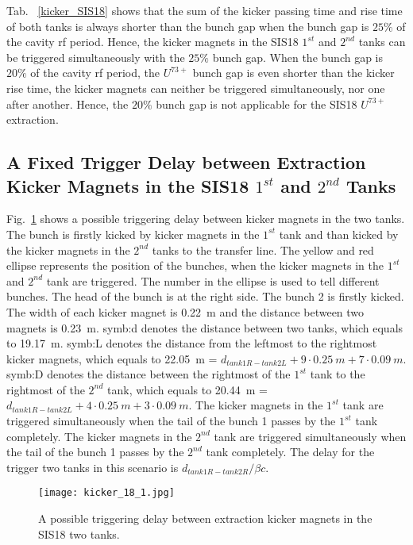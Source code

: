 Tab. ~\ref{kicker_SIS18} shows that the sum of the kicker passing time and rise time of both tanks is always shorter than the bunch gap when the bunch gap is $25\%$ of the cavity rf period. Hence, the kicker magnets in the SIS18 $1^{st}$ and $2^{nd}$ tanks can be triggered simultaneously with the $25\%$ bunch gap. When the bunch gap is $20\%$ of the cavity rf period, the $U^\mathit{73+}$ bunch gap is even shorter than the kicker rise time, the kicker magnets can neither be triggered simultaneously, nor one after another. Hence, the $20\%$ bunch gap is not applicable for the SIS18 $U^\mathit{73+}$ extraction.


\subsection{A Fixed Trigger Delay between Extraction Kicker Magnets in the SIS18 $1^{st}$ and $2^{nd}$ Tanks}

Fig.~\ref{kicker_18_1} shows a possible triggering delay between kicker magnets in the two tanks. The bunch is firstly kicked by kicker magnets in the $1^{st}$ tank and than kicked by the kicker magnets in the $2^{nd}$ tanks to the transfer line. The yellow and red ellipse represents the position of the bunches, when the kicker magnets in the $1^{st}$ and $2^{nd}$ tank are triggered. The number in the ellipse is used to tell different bunches. The head of the bunch is at the right side. The bunch 2 is firstly kicked. The width of each kicker magnet is \SI{0.22}{m} and the distance between two magnets is \SI{0.23}{m}. \gls{symb:d} denotes the distance between two tanks, which equals to \SI{19.17}{m}. \gls{symb:L} denotes the distance from the leftmost to the rightmost kicker magnets, which equals to \SI{22.05}{m} = $d_\mathit{tank1R-tank2L} + 9\cdot \SI{0.25}{m} + 7\cdot \SI{0.09}{m}$. \gls{symb:D} denotes the distance between the rightmost of the $1^{st}$ tank to the rightmost of the $2^{nd}$ tank, which equals to \SI{20.44}{m} = $d_\mathit{tank1R-tank2L} + 4\cdot \SI{0.25}{m} + 3\cdot \SI{0.09}{m}$. The kicker magnets in the $1^{st}$ tank are triggered simultaneously when the tail of the bunch 1 passes by the $1^{st}$ tank completely. The kicker magnets in the $2^{nd}$ tank are triggered simultaneously when the tail of the bunch 1 passes by the $2^{nd}$ tank completely. The delay for the trigger two tanks in this scenario is $d_\mathit{tank1R-tank2R}/\beta c$. 
\begin{figure}[H]
   \centering   
   \texttt{[image: kicker\_18\_1.jpg]}
   \caption{A possible triggering delay between extraction kicker magnets in the SIS18 two tanks.}
   \label{kicker_18_1}
\end{figure}

